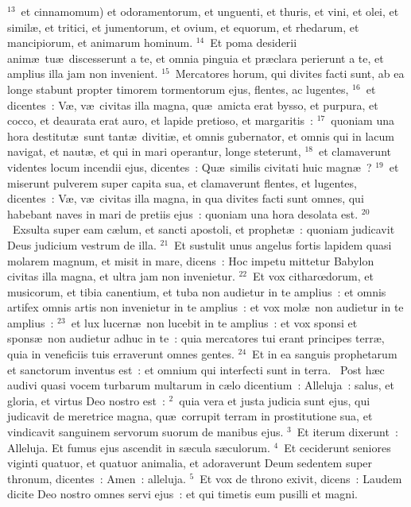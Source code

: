 ${}^{13}$~et cinnamomum) et odoramentorum, et unguenti, et thuris, et vini, et olei, et simil\ae , et tritici, et jumentorum, et ovium, et equorum, et rhedarum, et mancipiorum, et animarum hominum.
${}^{14}$~Et poma desiderii anim\ae\ tu\ae\ discesserunt a te, et omnia pinguia et pr\ae clara perierunt a te, et amplius illa jam non invenient.
${}^{15}$~Mercatores horum, qui divites facti sunt, ab ea longe stabunt propter timorem tormentorum ejus, flentes, ac lugentes,
${}^{16}$~et dicentes~: V\ae , v\ae\ civitas illa magna, qu\ae\ amicta erat bysso, et purpura, et cocco, et deaurata erat auro, et lapide pretioso, et margaritis~:
${}^{17}$~quoniam una hora destitut\ae\ sunt tant\ae\ diviti\ae , et omnis gubernator, et omnis qui in lacum navigat, et naut\ae , et qui in mari operantur, longe steterunt,
${}^{18}$~et clamaverunt videntes locum incendii ejus, dicentes~: Qu\ae\ similis civitati huic magn\ae~?
${}^{19}$~et miserunt pulverem super capita sua, et clamaverunt flentes, et lugentes, dicentes~: V\ae , v\ae\ civitas illa magna, in qua divites facti sunt omnes, qui habebant naves in mari de pretiis ejus~: quoniam una hora desolata est.
${}^{20}$~Exsulta super eam c\ae lum, et sancti apostoli, et prophet\ae~: quoniam judicavit Deus judicium vestrum de illa.
${}^{21}$~Et sustulit unus angelus fortis lapidem quasi molarem magnum, et misit in mare, dicens~: Hoc impetu mittetur Babylon civitas illa magna, et ultra jam non invenietur.
${}^{22}$~Et vox citharœdorum, et musicorum, et tibia canentium, et tuba non audietur in te amplius~: et omnis artifex omnis artis non invenietur in te amplius~: et vox mol\ae\ non audietur in te amplius~:
${}^{23}$~et lux lucern\ae\ non lucebit in te amplius~: et vox sponsi et spons\ae\ non audietur adhuc in te~: quia mercatores tui erant principes terr\ae , quia in veneficiis tuis erraverunt omnes gentes.
${}^{24}$~Et in ea sanguis prophetarum et sanctorum inventus est~: et omnium qui interfecti sunt in terra.
~Post h\ae c audivi quasi vocem turbarum multarum in c\ae lo dicentium~: Alleluja~: salus, et gloria, et virtus Deo nostro est~:
${}^{2}$~quia vera et justa judicia sunt ejus, qui judicavit de meretrice magna, qu\ae\ corrupit terram in prostitutione sua, et vindicavit sanguinem servorum suorum de manibus ejus.
${}^{3}$~Et iterum dixerunt~: Alleluja. Et fumus ejus ascendit in s\ae cula s\ae culorum.
${}^{4}$~Et ceciderunt seniores viginti quatuor, et quatuor animalia, et adoraverunt Deum sedentem super thronum, dicentes~: Amen~: alleluja.
${}^{5}$~Et vox de throno exivit, dicens~: Laudem dicite Deo nostro omnes servi ejus~: et qui timetis eum pusilli et magni.

